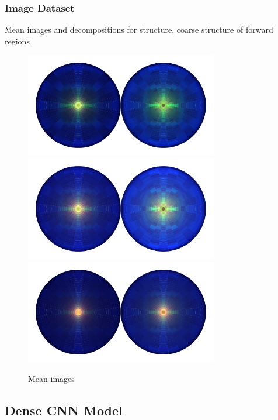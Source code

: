 \subsubsection{Image Dataset}
Mean images and decompositions for structure, coarse structure of forward regions
\begin{figure}[h!]
    \includegraphics[width=0.75\textwidth]{figures/event_selection/mean_vbf_PS_uw.pdf}
    \includegraphics[width=0.75\textwidth]{figures/event_selection/mean_ggh_PS_uw.pdf}
    \includegraphics[width=0.75\textwidth]{figures/event_selection/mean_bkg_PS_uw.pdf}
    \caption{Mean images}
    \label{fig:event_categorisation:mean_jet_image}
\end{figure}





\subsection{Dense CNN Model}

